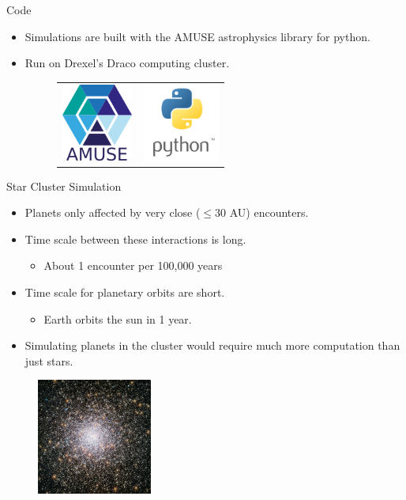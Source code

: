 \documentclass{beamer}
\begin{document}
\begin{frame}{Code}
    \begin{itemize}
        \item Simulations are built with the AMUSE astrophysics library for python.
        \item Run on Drexel's Draco computing cluster.
        \begin{figure}
            \centering
            \begin{tabular}{cc}
                \includegraphics[height=1in]{AmuseLogo} & \includegraphics[height=1in]{PythonLogo}
            \end{tabular}
        \end{figure}
    \end{itemize}
\end{frame}

\begin{frame}{Star Cluster Simulation}
    \begin{itemize}
        \item Planets only affected by very close ($\le $30 AU) encounters.
        \item Time scale between these interactions is long.
            \begin{itemize}
                \item About 1 encounter per 100,000 years
            \end{itemize}
        \item Time scale for planetary orbits are short.
            \begin{itemize}
                \item Earth orbits the sun in 1 year.
            \end{itemize}
        \item Simulating planets in the cluster would require much more
            computation than just stars.
    \end{itemize}
    \begin{figure}
        \includegraphics[height=1.5in]{star_cluster.jpg}
    \end{figure}
\end{frame}
\end{document}
